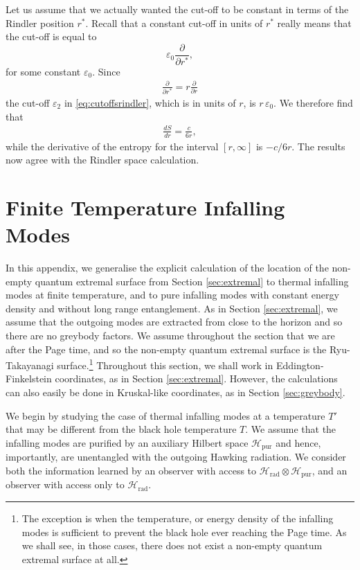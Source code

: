 \documentclass[11pt,a4paper]{article}
\begin{document}
Let us assume that we actually wanted the cut-off to be constant in terms of the Rindler position $r^*$. Recall that a constant cut-off in units of $r^*$ really means that the cut-off is equal to
$$
\varepsilon_0 \frac{\partial}{\partial r^*},
$$
for some constant $\varepsilon_0$. Since
\begin{align}
\frac{\partial}{\partial r^*} = r \frac{\partial}{\partial r}
\end{align}
 the cut-off $\varepsilon_2$ in \eqref{eq:cutoffsrindler}, which is in units of $r$, is $r\, \varepsilon_0$. We therefore find that
 \begin{align}
 \frac{d S}{d r} = \frac{c}{6 r},
 \end{align}
 while the derivative of the entropy for the interval $[r,\infty]$ is $-c / 6 r$. The results now agree with the Rindler space calculation.

\section{Finite Temperature Infalling Modes} \label{app:finitetemp}

In this appendix, we generalise the explicit calculation of the location of the non-empty quantum extremal surface from Section \ref{sec:extremal} to thermal infalling modes at finite temperature, and to pure infalling modes with constant energy density and without long range entanglement. As in Section \ref{sec:extremal}, we assume that the outgoing modes are extracted from close to the horizon and so there are no greybody factors. We assume throughout the section that we are after the Page time, and so the non-empty quantum extremal surface is the Ryu-Takayanagi surface.\footnote{The exception is when the temperature, or energy density of the infalling modes is sufficient to prevent the black hole ever reaching the Page time. As we shall see, in those cases, there does not exist a non-empty quantum extremal surface at all.} Throughout this section, we shall work in Eddington-Finkelstein coordinates, as in Section \ref{sec:extremal}. However, the calculations can also easily be done in Kruskal-like coordinates, as in Section \ref{sec:greybody}.

We begin by studying the case of thermal infalling modes at a temperature $T'$ that may be different from the black hole temperature $T$. We assume that the infalling modes are purified by an auxiliary Hilbert space $\mathcal{H}_\text{pur}$ and hence, importantly, are unentangled with the outgoing Hawking radiation. We consider both the information learned by an observer with access to $\mathcal{H}_\text{rad} \otimes \mathcal{H}_\text{pur}$, and an observer with access only to $\mathcal{H}_\text{rad}$.
\end{document}
